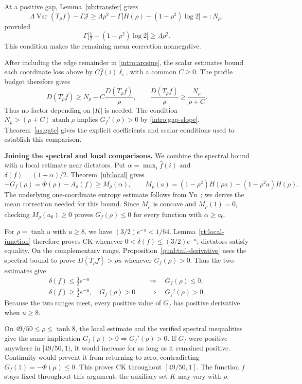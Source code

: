 \documentclass[11pt,letterpaper]{amsart}
\newcommand{\1}{\mathbf 1}
\DeclareMathOperator{\Var}{Var}
\DeclareMathOperator{\atanh}{atanh}
\numberwithin{equation}{section}
\begin{document}
At a positive gap, Lemma~\ref{ub:transfer} gives
\[
 \Lambda\Var(T_\rho f)-\Gamma\mathcal J
 \ge
 \Lambda\rho^2-\Gamma
       \bigl[H(\rho)-(1-\rho^2)\log2\bigr]
 =:N_\rho,
\]
provided
\[
 \Gamma\bigl[\tfrac12-(1-\rho^2)\log2\bigr]
 \ge\Lambda\rho^2.
\]
This condition makes the remaining mean correction nonnegative.

After including the edge remainder in \eqref{intro:arcsine},
the scalar estimates bound each coordinate loss above by
$C\widehat f(i)\ell_i$, with a common $C\ge0$.
The profile budget therefore gives
\[
 D(T_\rho f)\ge N_\rho-C\frac{D(T_\rho f)}{\rho},
 \qquad
 \frac{D(T_\rho f)}{\rho}\ge\frac{N_\rho}{\rho+C}.
\]
Thus no factor depending on $|K|$ is needed.
The condition $N_\rho>(\rho+C)\atanh\rho$ implies
$G_f'(\rho)>0$ by \eqref{intro:gap-slope}.
Theorem~\ref{as:gate} gives the explicit coefficients and scalar
conditions used to establish this comparison.

\medskip
\noindent\textbf{Joining the spectral and local comparisons.}
We combine the spectral bound with a local estimate near
dictators. Put $\alpha=\max_i\widehat f(i)$ and
$\delta(f)=(1-\alpha)/2$.
Theorem~\ref{ub:local} gives
\[
 -G_f(\rho)=\Phi(\rho)-A_\rho(f)
 \ge M_\rho(\alpha),\qquad
 M_\rho(a)=(1-\rho^2)H(\rho a)
              -(1-\rho^2a)H(\rho).
\]
The underlying one-coordinate entropy estimate follows from
Yu~\cite[Theorem~6.2]{Yu2026Local}; we derive the mean correction
needed for this bound.
Since $M_\rho$ is concave and $M_\rho(1)=0$, checking
$M_\rho(a_0)\ge0$ proves $G_f(\rho)\le0$ for every function
with $\alpha\ge a_0$.

For $\rho=\tanh u$ with $u\ge8$, we have
$(3/2)e^{-u}<1/64$.
Lemma~\ref{rt:local-junction} therefore proves CK whenever
$0<\delta(f)\le(3/2)e^{-u}$; dictators satisfy equality.
On the complementary range,
Proposition~\ref{qual:tail-derivative} uses the spectral bound
to prove $D(T_\rho f)>\rho u$ whenever $G_f(\rho)>0$.
Thus the two estimates give
\[
 \begin{aligned}
 \delta(f)\le\tfrac32e^{-u}
 &\quad\Longrightarrow\quad G_f(\rho)\le0,\\
 \delta(f)\ge\tfrac32e^{-u},\quad G_f(\rho)>0
 &\quad\Longrightarrow\quad G_f'(\rho)>0.
 \end{aligned}
\]
Because the two ranges meet, every positive value of $G_f$
has positive derivative when $u\ge8$.

On $49/50\le\rho\le\tanh8$, the local estimate and the
verified spectral inequalities give the same implication
$G_f(\rho)>0\Rightarrow G_f'(\rho)>0$.
If $G_f$ were positive anywhere in $[49/50,1)$, it would
increase for as long as it remained positive.
Continuity would prevent it from returning to zero,
contradicting $G_f(1)=-\Phi(\mu)\le0$.
This proves CK throughout $[49/50,1]$.
The function $f$ stays fixed throughout this argument;
the auxiliary set $K$ may vary with $\rho$.
\end{document}
